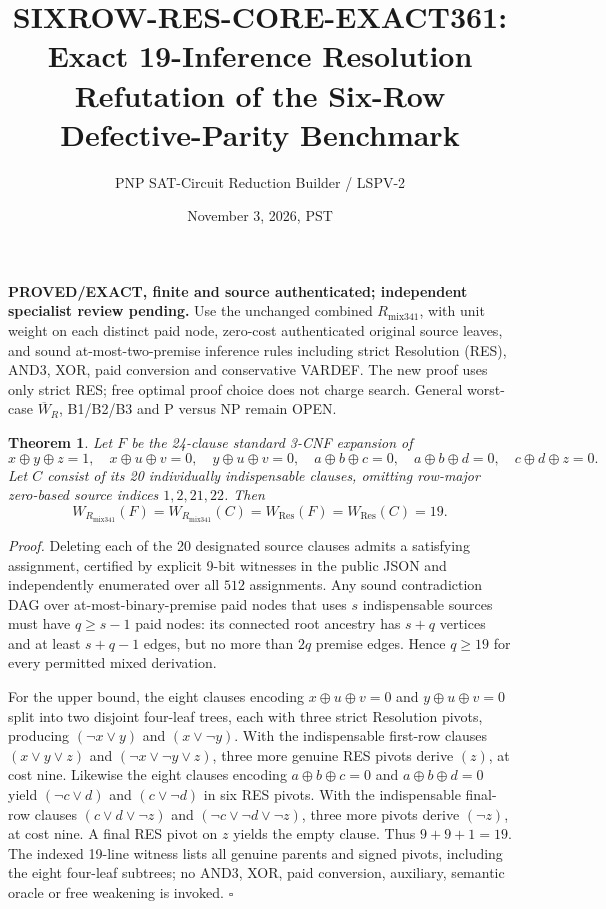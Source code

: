 \documentclass[11pt]{article}
\title{SIXROW-RES-CORE-EXACT361: Exact 19-Inference Resolution Refutation of the Six-Row Defective-Parity Benchmark}
\author{PNP SAT-Circuit Reduction Builder / LSPV-2}
\date{November 3, 2026, PST}
\newtheorem{theorem}{Theorem}
\begin{document}
\maketitle
\noindent\textbf{PROVED/EXACT, finite and source authenticated; independent specialist review pending.}
Use the unchanged combined $R_{\mathrm{mix341}}$, with unit weight on each distinct paid node, zero-cost authenticated original source leaves, and sound at-most-two-premise inference rules including strict Resolution (RES), AND3, XOR, paid conversion and conservative VARDEF. The new proof uses only strict RES; free optimal proof choice does not charge search. General worst-case $\overline W_R$, B1/B2/B3 and P versus NP remain OPEN.

\begin{theorem}
Let $F$ be the 24-clause standard 3-CNF expansion of
\[
x\oplus y\oplus z=1,\quad x\oplus u\oplus v=0,\quad
y\oplus u\oplus v=0,\quad a\oplus b\oplus c=0,\quad
a\oplus b\oplus d=0,\quad c\oplus d\oplus z=0.
\]
Let $C$ consist of its 20 individually indispensable clauses, omitting row-major zero-based source indices $1,2,21,22$.
Then
\[
\boxed{W_{R_{\mathrm{mix341}}}(F)=W_{R_{\mathrm{mix341}}}(C)
=W_{\mathrm{Res}}(F)=W_{\mathrm{Res}}(C)=19}.
\]
\end{theorem}
\noindent\emph{Proof.} Deleting each of the 20 designated source clauses admits a satisfying assignment, certified by explicit 9-bit witnesses in the public JSON and independently enumerated over all $512$ assignments. Any sound contradiction DAG over at-most-binary-premise paid nodes that uses $s$ indispensable sources must have $q\ge s-1$ paid nodes: its connected root ancestry has $s+q$ vertices and at least $s+q-1$ edges, but no more than $2q$ premise edges. Hence $q\ge19$ for every permitted mixed derivation.

For the upper bound, the eight clauses encoding $x\oplus u\oplus v=0$ and $y\oplus u\oplus v=0$ split into two disjoint four-leaf trees, each with three strict Resolution pivots, producing $(\neg x\lor y)$ and $(x\lor\neg y)$. With the indispensable first-row clauses $(x\lor y\lor z)$ and $(\neg x\lor\neg y\lor z)$, three more genuine RES pivots derive $(z)$, at cost nine. Likewise the eight clauses encoding $a\oplus b\oplus c=0$ and $a\oplus b\oplus d=0$ yield $(\neg c\lor d)$ and $(c\lor\neg d)$ in six RES pivots. With the indispensable final-row clauses $(c\lor d\lor\neg z)$ and $(\neg c\lor\neg d\lor\neg z)$, three more pivots derive $(\neg z)$, at cost nine. A final RES pivot on $z$ yields the empty clause. Thus $9+9+1=19$. The indexed 19-line witness lists all genuine parents and signed pivots, including the eight four-leaf subtrees; no AND3, XOR, paid conversion, auxiliary, semantic oracle or free weakening is invoked. \hfill$\square$
\end{document}

